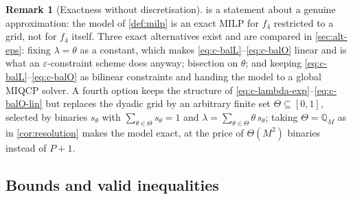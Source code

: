 \documentclass[11pt,a4paper]{article}
\theoremstyle{definition}
\newtheorem{remark}[definition]{Remark}
\theoremstyle{plain}
\begin{document}
\begin{remark}[Exactness without discretisation]
\label{rem:exactness}
 is a statement about a genuine approximation: the model of
\cref{def:milp} is an exact MILP for $f_4$ restricted to a grid, not for $f_4$
itself.  Three exact alternatives exist and are compared in
\cref{sec:alt-eps}: fixing $\lambda = \theta$ as a constant, which makes
\eqref{eq:c-balL}--\eqref{eq:c-balO} linear and is what an
$\varepsilon$-constraint scheme does anyway; bisection on $\theta$; and keeping
\eqref{eq:c-balL}--\eqref{eq:c-balO} as bilinear constraints and handing the
model to a global MIQCP solver.  A fourth option keeps the structure of
\eqref{eq:c-lambda-exp}--\eqref{eq:c-balO-lin} but replaces the dyadic grid by
an arbitrary finite set $\Theta \subseteq [0,1]$, selected by binaries
$s_\theta$ with $\sum_{\theta \in \Theta} s_\theta = 1$ and
$\lambda = \sum_{\theta \in \Theta} \theta\, s_\theta$; taking
$\Theta = \mathbb{Q}_M$ as in \cref{cor:resolution} makes the model exact, at
the price of $\Theta(M^2)$ binaries instead of $P+1$.
\end{remark}

\subsection{Bounds and valid inequalities}
\label{sec:milp-bounds}
\end{document}
